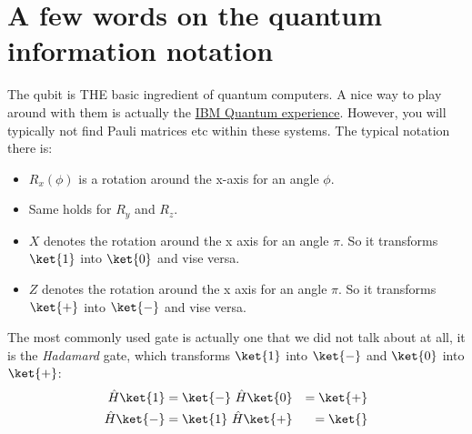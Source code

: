\section{A few words on the quantum information notation}

The qubit is THE basic ingredient of quantum computers. A nice way to play around with them is actually the \href{https://quantum-computing.ibm.com/}{IBM Quantum experience}. However, you will typically not find Pauli matrices etc within these systems. The typical notation there is:
\begin{itemize}
\item $R_x(\phi)$ is a rotation around the x-axis for an angle $\phi$.
\item Same holds for $R_y$ and $R_z$.
\item $X$ denotes the rotation around the x axis for an angle $\pi$. So it transforms $\ket{1}$ into  $\ket{0}$ and vise versa.
\item $Z$ denotes the rotation around the x axis for an angle $\pi$. So it transforms $\ket{+}$ into  $\ket{-}$ and vise versa.
\end{itemize}
The most commonly used gate is actually one that we did not talk about at all, it is the \textit{Hadamard} gate, which transforms $\ket{1}$ into  $\ket{-}$ and $\ket{0}$ into  $\ket{+}$:
\begin{align}
\hat{H}\ket{1} &= \ket{-}  ~   \hat{H}\ket{0} &= \ket{+}\\
\hat{H}\ket{-} &= \ket{1}  ~   \hat{H}\ket{+} &= \ket{}\\
\end{align}